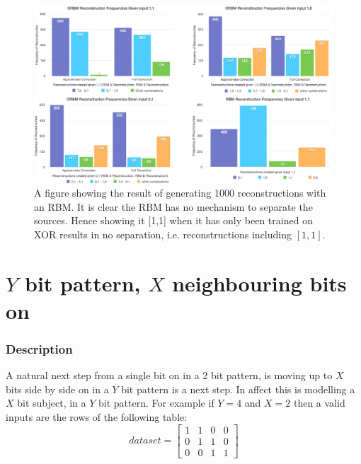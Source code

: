 \begin{landscape}
\begin{figure}
  \begin{center}
    \includegraphics[height=0.9\textheight]{Assets/results/xor-results}
  \end{center}
  \caption{A figure showing the result of generating 1000 reconstructions with an RBM. It is clear the RBM has no mechanism to separate the sources. Hence showing it [1,1] when it has only been trained on XOR results in no separation, i.e. reconstructions including $[1,1]$.}

  \label{F:Two-Bit-RBM-Inference-Results-1}
\end{figure}
\end{landscape}



\section{$Y$ bit pattern, $X$ neighbouring bits on} %

\subsubsection{Description}
A natural next step from a single bit on in a 2 bit pattern, is moving up to $X$  bits side by side on in a $Y$ bit pattern is a next step. In affect this is modelling a $X$ bit subject, in a $Y$ bit pattern.
For example if $Y = 4 $ and $ X = 2 $ then a valid inputs are the rows of the following table:
\begin{equation}\label{eq:Example-xy-dataset} dataset =
\begin{bmatrix}
  1 & 1 & 0 & 0 \\
  0 & 1 & 1 & 0 \\
  0 & 0 & 1 & 1
\end{bmatrix}
\end{equation}

